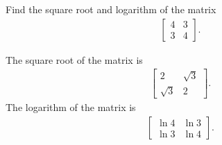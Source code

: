 \documentclass[en]{sol-man}
\begin{document}
\begin{exe}
    Find the square root and logarithm of the matrix
    \begin{align}
        \begin{bmatrix}
            4&3\\
            3&4
        \end{bmatrix}.
    \end{align}
\end{exe}
\begin{sol}
    The square root of the matrix is
    \begin{align}
        \begin{bmatrix}
            2&\sqrt{3}\\
            \sqrt{3}&2
        \end{bmatrix}.
    \end{align}
    The logarithm of the matrix is
    \begin{align}
        \begin{bmatrix}
            \ln 4&\ln 3\\
            \ln 3&\ln 4
        \end{bmatrix}.
    \end{align}
\end{sol}
\end{document}
